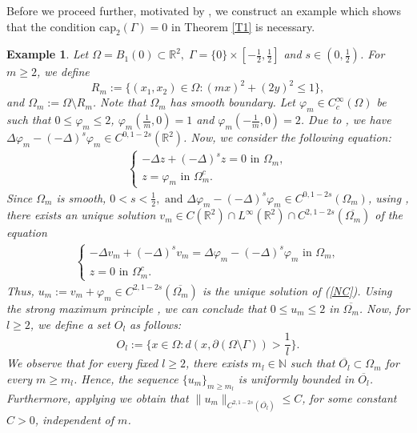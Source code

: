 \documentclass[11pt, notitlepage]{article}
\def\R{\mathbb{R}}
\newtheorem{Example}{Example}
\begin{document}
{ Before we proceed further, motivated by \cite[Example 2]{BV20}, we construct an example which shows that the condition $\mathrm{cap}_2(\Gamma)=0$ in Theorem \ref{T1} is necessary.
\begin{Example}\label{necessary}
    Let $\Omega=B_1(0)\subset \R^2,\;\Gamma=\{0\}\times[-\frac{1}{2},\frac{1}{2}]$ and $s\in(0,\frac{1}{2})$. For $m\geq 2$, we define $$R_m:=\{(x_1,x_2)\in \Omega: (mx)^2+(2y)^2\leq 1\},$$
    and $\Omega_m:=\Omega\setminus R_m$. Note that $\Omega_m$ has smooth boundary. Let $\varphi_m\in C^\infty_c(\Omega)$ be such that $0\leq \varphi_m\leq 2$, $\varphi_m(\frac{1}{m},0)=1$ and $\varphi_m(-\frac{1}{m},0)=2$. Due to \cite[Proposition 2.5]{Silvestre}, we have $\Delta\varphi_m-(-\Delta)^s\varphi_m\in C^{0,1-2s}(\R^2)$. Now, we consider the following equation:
    \begin{align}\label{NC}
        \begin{cases}
            -\Delta z+(-\Delta)^sz=0\mbox{ in }\Omega_m,\\
            z=\varphi_m\mbox{ in }\Omega_m^c.
        \end{cases}
    \end{align}
    Since $\Omega_m$ is smooth, $0<s<\frac{1}{2},\mbox{ and } \Delta\varphi_m-(-\Delta)^s\varphi_m\in C^{0,1-2s}(\Omega_m)$, using \cite[Theorem 2.8]{Valdinoci23}, there exists an unique solution $v_m\in C(\R^2)\cap L^\infty(\R^2)\cap C^{2,1-2s}(\overline{\Omega_m})$ of the equation 
    \begin{align}
        \begin{cases}
            -\Delta v_m+(-\Delta)^sv_m=\Delta\varphi_m-(-\Delta)^s\varphi_m\mbox{ in }\Omega_m,\\
            z=0\mbox{ in }\Omega_m^c.
        \end{cases}
    \end{align}
    Thus, $u_m:=v_m+\varphi_m\in C^{2,1-2s}(\overline{\Omega_m})$ is the unique solution of (\ref{NC}). Using the strong maximum principle \cite[Theorem 1.3]{ValdinociCPDE}, we can conclude that $0\leq u_m\leq 2$ in $\overline{\Omega_m}$. Now, for $l\geq 2$, we define a set $O_l$ as follows:
    $$O_l:=\{x\in \Omega: d(x,\partial(\Omega\setminus\Gamma))>\frac{1}{l}\}.$$
We observe that for every fixed $l\geq 2$, there exists $m_l\in\mathbb{N}$ such that $\overline{O_l}\subset \Omega_m$ for every $m\geq m_l$. Hence, the sequence $\{u_m\}_{m\geq m_l}$ is uniformly bounded in $\overline{O_l}$. Furthermore, applying \cite[Theorem 1.6]{ValdinociJDE25} we obtain that $\|u_m\|_{C^{2,1-2s}(\overline{O_l})}\leq C$, for some constant $C>0$, independent of $m$.

\end{Example}}
\end{document}
